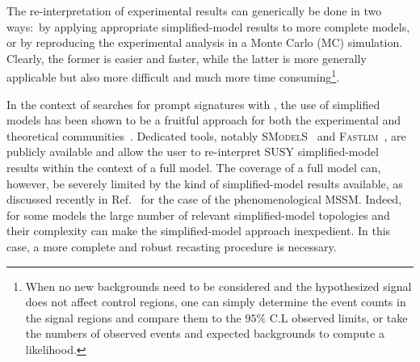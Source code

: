 The re-interpretation of experimental results can generically be done in two ways:~by applying
appropriate simplified-model results to more complete models, or by reproducing the experimental analysis in a Monte Carlo (MC) simulation.
Clearly,  the former is easier and faster,
while the latter is more generally applicable but also more difficult and much more time consuming\footnote{When no new backgrounds
need to be considered and the hypothesized signal does not affect control regions, one can simply determine the
event counts in the signal regions and compare them to the $95\%$ C.L observed limits, or take the numbers of observed events and expected backgrounds to compute a likelihood.}.

In the context of searches for prompt signatures with \MET, the use of simplified models has been shown to be a fruitful approach for both the experimental and theoretical communities~\cite{ArkaniHamed:2007fw, Alwall:2008ag, Alves:2011wf, Okawa:2011xg,Chatrchyan:2013sza,Abercrombie:2015wmb,Boveia:2016mrp}.
Dedicated tools, notably \textsc{SModelS}~\cite{Kraml:2013mwa,Ambrogi:2017neo,Ambrogi:2018ujg} and \textsc{Fastlim}~\cite{Papucci:2014rja},
are publicly available and allow the user to re-interpret SUSY simplified-model results within the context of a full model.
The coverage of a full model can, however, be severely limited by the kind of simplified-model results available,
as discussed recently in Ref.~\cite{Ambrogi:2017lov} for the case of the phenomenological MSSM.
Indeed, for some models the large number of relevant simplified-model topologies and their complexity
can make the simplified-model approach inexpedient.
In this case, a more complete and robust recasting procedure is necessary.


